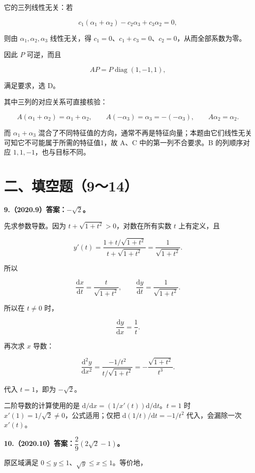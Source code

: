 \documentclass[UTF8,11pt,fontset=windows]{ctexart}
\begin{document}
它的三列线性无关：若

$$
c_1(\alpha_1+\alpha_2)-c_2\alpha_3+c_3\alpha_2=0,
$$

则由 $\alpha_1,\alpha_2,\alpha_3$ 线性无关，得 $c_1=0$、$c_1+c_3=0$、$c_2=0$，从而全部系数为零。

因此 $P$ 可逆，而且

$$
AP=P\operatorname{diag}(1,-1,1),
$$

满足要求，选 D。

其中三列的对应关系可直接核验：

$$
A(\alpha_1+\alpha_2)=\alpha_1+\alpha_2,
\qquad A(-\alpha_3)=\alpha_3=-(-\alpha_3),
\qquad A\alpha_2=\alpha_2.
$$

而 $\alpha_1+\alpha_3$ 混合了不同特征值的方向，通常不再是特征向量；本题由它们线性无关可知它不可能属于所需的特征值1，故 A、C 中的第一列不合要求。B 的列顺序对应 $1,1,-1$，也与目标不同。

\clearpage

\section*{二、填空题（9～14）}

\textbf{9.（2020.9）答案：$-\sqrt2$。}

先求参数导数。因为 $t+\sqrt{1+t^2}>0$，对数在所有实数 $t$ 上有定义，且

$$
y'(t)=\frac{1+t/\sqrt{1+t^2}}{t+\sqrt{1+t^2}}
=\frac1{\sqrt{1+t^2}}.
$$

所以

$$
\frac{\mathrm dx}{\mathrm dt}=\frac t{\sqrt{1+t^2}},
\qquad
\frac{\mathrm dy}{\mathrm dt}=\frac1{\sqrt{1+t^2}}.
$$

所以在 $t\ne0$ 时，

$$
\frac{\mathrm dy}{\mathrm dx}=\frac1t.
$$

再次求 $x$ 导数：

$$
\frac{\mathrm d^2y}{\mathrm dx^2}
=\frac{-1/t^2}{t/\sqrt{1+t^2}}
=-\frac{\sqrt{1+t^2}}{t^3}.
$$

代入 $t=1$，即为 $-\sqrt2$。

二阶导数的计算使用的是 $\mathrm d/\mathrm dx=(1/x'(t))\mathrm d/\mathrm dt$。$t=1$ 时 $x'(1)=1/\sqrt2\ne0$，公式适用；仅把 $\mathrm d(1/t)/\mathrm dt=-1/t^2$ 代入，会漏除一次 $x'(t)$。

\clearpage

\textbf{10.（2020.10）答案：$\dfrac29(2\sqrt2-1)$。}

原区域满足 $0\le y\le1$、$\sqrt y\le x\le1$。等价地，
\end{document}
